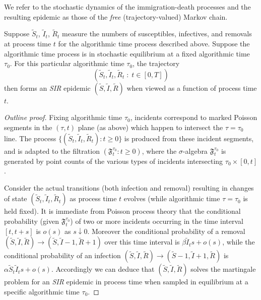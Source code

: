\documentclass[]{article}
\newcommand{\Filter}{\mathfrak{F}}
\newcommand{\SIR}{\emph{SIR}\xspace}
\begin{document}
 We refer to the stochastic dynamics of the immigration-death processes and the resulting
 epidemic
 as those of the \emph{free} 
 (trajectory-valued) Markov chain.

 \begin{thm}\label{thm:SIR-epidemic-1}
 Suppose \(\widetilde{S}_t\), \(\widetilde{I}_t\), \(\widetilde{R}_t\) measure the numbers of
 susceptibles, infectives, and removals 
at process time \(t\) for the algorithmic time process described above.
Suppose the algorithmic time process is 
 in stochastic equilibrium
 at a fixed algorithmic time \(\tau_0\).
For this particular algorithmic time \(\tau_0\), the trajectory 
\[
\left(\widetilde{S}_t, \widetilde{I}_t, \widetilde{R}_t\;:\; t\in[0,T]\right)
\]
then forms an \SIR epidemic \((\widetilde{S}, \widetilde{I}, \widetilde{R})\) 
when
 viewed as a function of process time \(t\).
\end{thm}
\begin{proof}[Outline proof]
Fixing algorithmic time \(\tau_0\),
incidents correspond to marked Poisson
segments in the \((\tau,t)\) plane (as above)
which happen to
intersect the \(\tau=\tau_0\) line.
The process \(\{(\widetilde{S}_t, \widetilde{I}_t, \widetilde{R}_t):t\geq0\}\) 
is produced from these incident segments,
and is adapted to the filtration 
\((\Filter_t^{\tau_0}: t\geq0)\),
where the \(\sigma\)-algebra
\(\Filter^{\tau_0}_t\) is generated by point counts of 
the various types of incidents intersecting
\(\tau_0\times[0,t]\).

Consider the actual transitions (both infection
and removal) resulting in changes of state 
\((\widetilde{S}_t, \widetilde{I}_t, \widetilde{R}_t)\)
as process time \(t\) evolves (while algorithmic time \(\tau=\tau_0\) 
is held fixed).
It is immediate from Poisson process theory
that the conditional probability
(given \(\Filter^{\tau_0}_t\))
of two or more incidents
occurring in the time interval \([t,t+s]\)
is \(o(s)\) as \(s\downarrow0\).
Moreover the conditional probability of
a removal \((\widetilde{S}, \widetilde{I}, \widetilde{R})\to(\widetilde{S}, \widetilde{I}-1, \widetilde{R}+1)\)
over this time interval is 
\(\beta\widetilde{I}_t s+o(s)\),
while the conditional probability of an infection
\((\widetilde{S}, \widetilde{I}, \widetilde{R})\to(\widetilde{S}-1, \widetilde{I}+1, \widetilde{R})\)
is 
\(\alpha\widetilde{S}_t \widetilde{I}_t s+o(s)\).
Accordingly we can deduce that
\((\widetilde{S}, \widetilde{I}, \widetilde{R})\)
solves the martingale problem \citep{StroockVaradhan-1979}
for an \SIR epidemic
in process time when sampled in equilibrium 
at a specific algorithmic time \(\tau_0\).
\end{proof}
\end{document}
